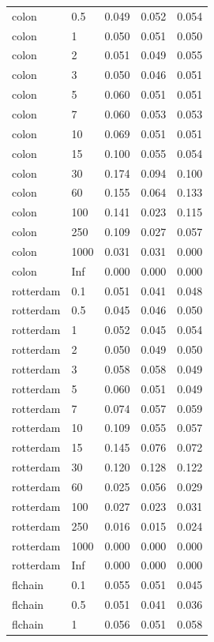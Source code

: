 \begin{tabular}{lllll}
  colon & 0.5 & 0.049 & 0.052 & 0.054 \\ 
  colon & 1 & 0.050 & 0.051 & 0.050 \\ 
  colon & 2 & 0.051 & 0.049 & 0.055 \\ 
  colon & 3 & 0.050 & 0.046 & 0.051 \\ 
  colon & 5 & 0.060 & 0.051 & 0.051 \\ 
  colon & 7 & 0.060 & 0.053 & 0.053 \\ 
  colon & 10 & 0.069 & 0.051 & 0.051 \\ 
  colon & 15 & 0.100 & 0.055 & 0.054 \\ 
  colon & 30 & 0.174 & 0.094 & 0.100 \\ 
  colon & 60 & 0.155 & 0.064 & 0.133 \\ 
  colon & 100 & 0.141 & 0.023 & 0.115 \\ 
  colon & 250 & 0.109 & 0.027 & 0.057 \\ 
  colon & 1000 & 0.031 & 0.031 & 0.000 \\ 
  colon & Inf & 0.000 & 0.000 & 0.000 \\ 
  rotterdam & 0.1 & 0.051 & 0.041 & 0.048 \\ 
  rotterdam & 0.5 & 0.045 & 0.046 & 0.050 \\ 
  rotterdam & 1 & 0.052 & 0.045 & 0.054 \\ 
  rotterdam & 2 & 0.050 & 0.049 & 0.050 \\ 
  rotterdam & 3 & 0.058 & 0.058 & 0.049 \\ 
  rotterdam & 5 & 0.060 & 0.051 & 0.049 \\ 
  rotterdam & 7 & 0.074 & 0.057 & 0.059 \\ 
  rotterdam & 10 & 0.109 & 0.055 & 0.057 \\ 
  rotterdam & 15 & 0.145 & 0.076 & 0.072 \\ 
  rotterdam & 30 & 0.120 & 0.128 & 0.122 \\ 
  rotterdam & 60 & 0.025 & 0.056 & 0.029 \\ 
  rotterdam & 100 & 0.027 & 0.023 & 0.031 \\ 
  rotterdam & 250 & 0.016 & 0.015 & 0.024 \\ 
  rotterdam & 1000 & 0.000 & 0.000 & 0.000 \\ 
  rotterdam & Inf & 0.000 & 0.000 & 0.000 \\ 
  flchain & 0.1 & 0.055 & 0.051 & 0.045 \\ 
  flchain & 0.5 & 0.051 & 0.041 & 0.036 \\ 
  flchain & 1 & 0.056 & 0.051 & 0.058 \\ 

\end{tabular}
